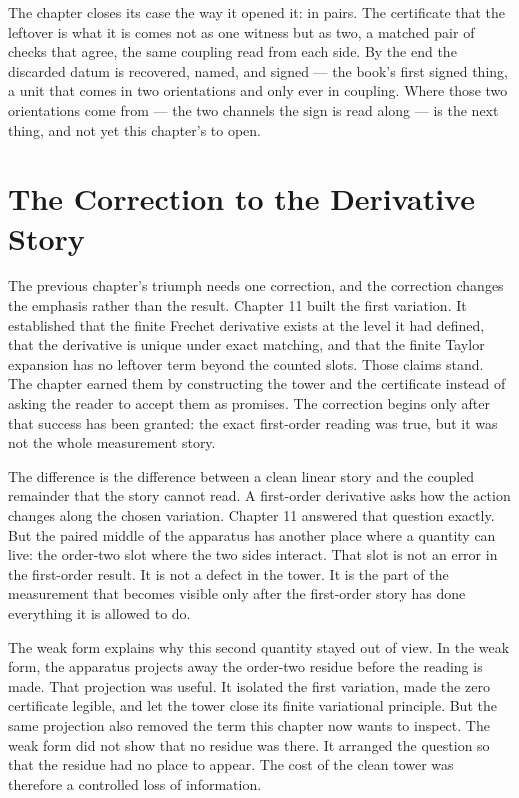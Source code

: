 The chapter closes its case the way it opened it: in pairs. The certificate that the leftover is what it is comes not as one witness but as two, a matched pair of checks that agree, the same coupling read from each side. By the end the discarded datum is recovered, named, and signed --- the book's first signed thing, a unit that comes in two orientations and only ever in coupling. Where those two orientations come from --- the two channels the sign is read along --- is the next thing, and not yet this chapter's to open.

\section{The Correction to the Derivative Story}

The previous chapter's triumph needs one correction, and the correction changes
the emphasis rather than the result. Chapter 11 built the first variation. It
established that the finite Frechet derivative exists at the level it had defined,
that the derivative is unique under exact matching, and that the finite Taylor
expansion has no leftover term beyond the counted slots. Those claims stand.
The chapter earned them by constructing the tower and the certificate instead
of asking the reader to accept them as promises. The correction begins only
after that success has been granted: the exact first-order reading was true,
but it was not the whole measurement story.

The difference is the difference between a clean linear story and the coupled
remainder that the story cannot read. A first-order derivative asks how the
action changes along the chosen variation. Chapter 11 answered that question
exactly. But the paired middle of the apparatus has another place where a
quantity can live: the order-two slot where the two sides interact. That slot
is not an error in the first-order result. It is not a defect in the tower. It
is the part of the measurement that becomes visible only after the first-order
story has done everything it is allowed to do.

The weak form explains why this second quantity stayed out of view. In the
weak form, the apparatus projects away the order-two residue before the
reading is made. That projection was useful. It isolated the first variation,
made the zero certificate legible, and let the tower close its finite
variational principle. But the same projection also removed the term this
chapter now wants to inspect. The weak form did not show that no residue was
there. It arranged the question so that the residue had no place to appear.
The cost of the clean tower was therefore a controlled loss of information.

